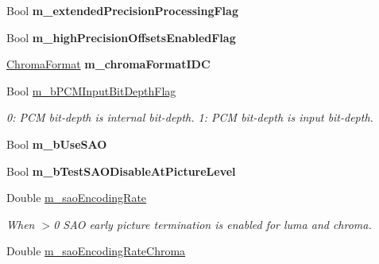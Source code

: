 \begin{DoxyCompactItemize}
\mbox{\label{class_t_app_enc_cfg_a305b4c65678eda046bff0d916caf6ad9}} 
Bool {\bfseries m\+\_\+extended\+Precision\+Processing\+Flag}
\item 
\mbox{\label{class_t_app_enc_cfg_a2f27b45b761cbf36998b5768022b9233}} 
Bool {\bfseries m\+\_\+high\+Precision\+Offsets\+Enabled\+Flag}
\item 
\mbox{\label{class_t_app_enc_cfg_afdf9dee8b8c911444913c0c85548a8d1}} 
\hyperlink{_type_def_8h_a4a6c51c10f2eb04abc7209db7caff39f}{Chroma\+Format} {\bfseries m\+\_\+chroma\+Format\+I\+DC}
\item 
\mbox{\label{class_t_app_enc_cfg_ac64f843dff87faff5c015899276c7e8b}} 
Bool \hyperlink{class_t_app_enc_cfg_ac64f843dff87faff5c015899276c7e8b}{m\+\_\+b\+P\+C\+M\+Input\+Bit\+Depth\+Flag}
\begin{DoxyCompactList}\small\item\em 0\+: P\+CM bit-\/depth is internal bit-\/depth. 1\+: P\+CM bit-\/depth is input bit-\/depth. \end{DoxyCompactList}\item 
\mbox{\label{class_t_app_enc_cfg_af93444fb1806e456d7163abb1de02b3f}} 
Bool {\bfseries m\+\_\+b\+Use\+S\+AO}
\item 
\mbox{\label{class_t_app_enc_cfg_aaaa0f1b9a8141beb8708a62a7723688f}} 
Bool {\bfseries m\+\_\+b\+Test\+S\+A\+O\+Disable\+At\+Picture\+Level}
\item 
\mbox{\label{class_t_app_enc_cfg_a2731c4f44c6c630521dee19304a88e7a}} 
Double \hyperlink{class_t_app_enc_cfg_a2731c4f44c6c630521dee19304a88e7a}{m\+\_\+sao\+Encoding\+Rate}
\begin{DoxyCompactList}\small\item\em When $>$0 S\+AO early picture termination is enabled for luma and chroma. \end{DoxyCompactList}\item 
\mbox{\label{class_t_app_enc_cfg_a47c81d6931a058dc70b13f86ef99ce02}} 
Double \hyperlink{class_t_app_enc_cfg_a47c81d6931a058dc70b13f86ef99ce02}{m\+\_\+sao\+Encoding\+Rate\+Chroma}

\end{DoxyCompactItemize}
